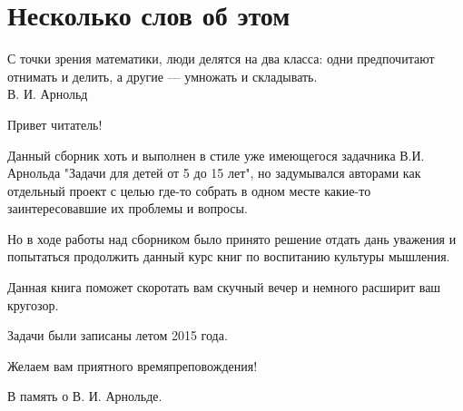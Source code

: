 \chapter*{Несколько слов об этом}

\begin{flushright}
{\scriptsize С точки зрения математики, люди делятся на два класса: одни предпочитают отнимать и делить, а другие — умножать и складывать.\\
В. И. Арнольд}
\end{flushright}

    Привет читатель!


    Данный сборник хоть и выполнен в стиле уже имеющегося задачника
В.И. Арнольда "Задачи для детей от 5 до 15 лет", но задумывался
авторами как отдельный проект с целью где-то собрать в одном месте
какие-то заинтересовавшие их проблемы и вопросы.


Но в ходе работы над сборником было принято решение отдать дань
уважения и попытаться продолжить данный курс книг по воспитанию
культуры мышления.


Данная книга поможет скоротать вам скучный вечер и немного расширит ваш кругозор.

Задачи были записаны летом 2015 года.

Желаем вам приятного времяпреповождения!


В память о В. И. Арнольде.
